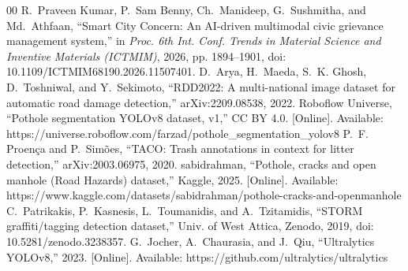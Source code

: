 \documentclass[conference]{IEEEtran}
\begin{document}
\begin{thebibliography}{00}
 R.~Praveen Kumar, P.~Sam Benny, Ch.~Manideep, G.~Sushmitha, and Md.~Athfaan, ``Smart City Concern: An AI-driven multimodal civic grievance management system,'' in \textit{Proc. 6th Int. Conf. Trends in Material Science and Inventive Materials (ICTMIM)}, 2026, pp. 1894--1901, doi: 10.1109/ICTMIM68190.2026.11507401.
 D.~Arya, H.~Maeda, S.~K. Ghosh, D.~Toshniwal, and Y.~Sekimoto, ``RDD2022: A multi-national image dataset for automatic road damage detection,'' arXiv:2209.08538, 2022.
 Roboflow Universe, ``Pothole segmentation YOLOv8 dataset, v1,'' CC BY 4.0. [Online]. Available: https://universe.roboflow.com/farzad/pothole\_segmentation\_yolov8
 P.~F. Proen\c{c}a and P.~Sim\~{o}es, ``TACO: Trash annotations in context for litter detection,'' arXiv:2003.06975, 2020.
 sabidrahman, ``Pothole, cracks and open manhole (Road Hazards) dataset,'' Kaggle, 2025. [Online]. Available: https://www.kaggle.com/datasets/sabidrahman/pothole-cracks-and-openmanhole
 C.~Patrikakis, P.~Kasnesis, L.~Toumanidis, and A.~Tzitamidis, ``STORM graffiti/tagging detection dataset,'' Univ. of West Attica, Zenodo, 2019, doi: 10.5281/zenodo.3238357.
 G.~Jocher, A.~Chaurasia, and J.~Qiu, ``Ultralytics YOLOv8,'' 2023. [Online]. Available: https://github.com/ultralytics/ultralytics
\end{thebibliography}
\end{document}
